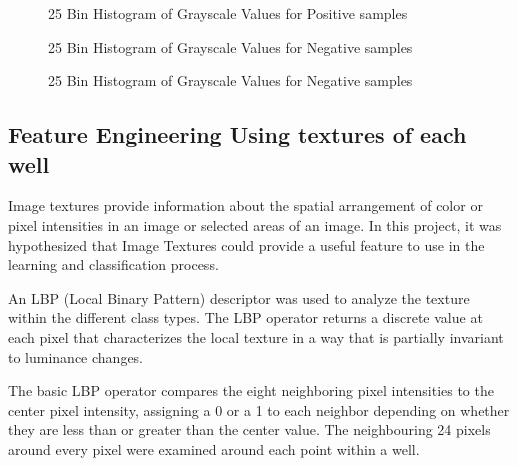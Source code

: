 \documentclass[a4paper,twoside,12pt]{report}
\begin{document}
\begin{figure}[!htbp]
\centering
{}\hfill
{}
\caption{25 Bin Histogram of Grayscale Values for Positive samples}
\label{fig:subfigures}
\end{figure}

\begin{figure}[!htbp]
\centering
{}\hfill
{}
\caption{25 Bin Histogram of Grayscale Values for Negative samples}
\label{fig:subfigures}
\end{figure}

\begin{figure}[!htbp]
\centering
{}\hfill
{}
\caption{25 Bin Histogram of Grayscale Values for Negative samples}
\label{fig:subfigures}
\end{figure}


\subsection{Feature Engineering Using textures of each well} 

Image textures provide information about the spatial arrangement of color or pixel intensities in an image or selected areas of an image.    In this project, it was hypothesized that Image Textures could provide a useful feature to use in the learning and classification process.     

An LBP (Local Binary Pattern) descriptor was used to analyze the texture within the different class types.  The LBP operator returns a discrete value at each pixel that characterizes the local texture in a way that is partially invariant to luminance changes.  

The basic LBP operator compares the eight neighboring pixel intensities to the center pixel intensity, assigning a 0 or a 1 to each neighbor depending on whether
they are less than or greater than the center value.   The neighbouring 24 pixels around every pixel were examined around each point within a well. 
\end{document}
